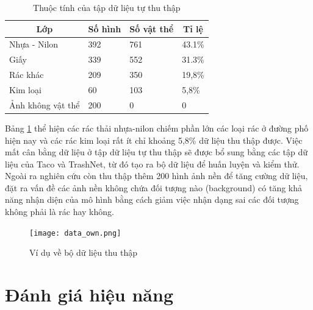 \documentclass[../the.tex]{subfiles}
\begin{document}
{\fontsize{13}{12} \selectfont
\begin{table}[!ht]
	\centering
	\caption{Thuộc tính của tập dữ liệu tự thu thập}
	\begin{tabular}{|l|l|l|l|}
		\hline
		 \multicolumn{1}{|c|}{\textbf{Lớp}}
		 & \multicolumn{1}{c|}{\textbf{Số hình}} 
		 & \multicolumn{1}{c|}{\textbf{Số vật thể}}
		 & \multicolumn{1}{c|}{\textbf{Tỉ lệ}}
		  \\
		\hline

		  Nhựa - Nilon & 392 & 761 & 43.1\%  \\
		\hline

			Giấy & 339 & 552   & 31.3\%                                        \\
		\hline

		 Rác khác & 209 & 350   & 19,8\%                                        \\
		\hline

		 Kim loại & 60 & 103    & 5,8\%                                         \\
		\hline
		 Ảnh không vật thể & 200 & 0   & 0                                         \\
		\hline

	\end{tabular}

	\label{tab:datasetown}
\end{table}
Bảng \ref{tab:datasetown} thể hiện các rác thải nhựa-nilon chiếm phần lớn các loại rác ở đường phố hiện nay và các rác kim loại rất ít chỉ khoảng 5,8\% dữ liệu thu thập được.
Việc mất cân bằng dữ liệu ở tập dữ liệu tự thu thập sẽ được bổ sung bằng các tập dữ liệu của Taco và TrashNet, từ đó tạo ra bộ dữ liệu để huấn luyện và kiểm thử.
Ngoài ra nghiên cứu còn thu thập thêm 200 hình ảnh nền để tăng cường dữ liệu, đặt ra vấn đề các ảnh nền không chứa đối tượng nào (background) có tăng khả năng nhận diện của mô hình bằng cách giảm việc nhận dạng sai các đối tượng không phải là rác hay không.

}


\begin{figure}[H]
	\centering
	\texttt{[image: data\_own.png]}
	\caption{Ví dụ về bộ dữ liệu thu thập}
	\label{fig:dataset_own}
\end{figure}
\section{Đánh giá hiệu năng}
\label{sec:eval}
\end{document}
